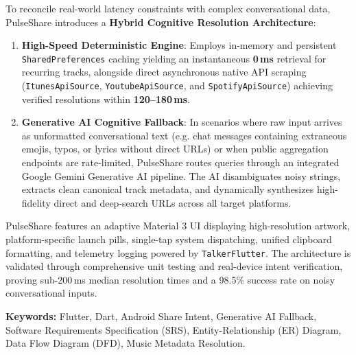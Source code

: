 \documentclass[12pt,a4paper]{report}
\begin{document}
\vspace{0.4cm}
\noindent To reconcile real-world latency constraints with complex conversational data, PulseShare introduces a \textbf{Hybrid Cognitive Resolution Architecture}:
\begin{enumerate}
    \item \textbf{High-Speed Deterministic Engine}: Employs in-memory and persistent \texttt{SharedPreferences} caching yielding an instantaneous \textbf{0\,ms} retrieval for recurring tracks, alongside direct asynchronous native API scraping (\texttt{ItunesApiSource}, \texttt{YoutubeApiSource}, and \texttt{SpotifyApiSource}) achieving verified resolutions within \textbf{120--180\,ms}.
    \item \textbf{Generative AI Cognitive Fallback}: In scenarios where raw input arrives as unformatted conversational text (e.g. chat messages containing extraneous emojis, typos, or lyrics without direct URLs) or when public aggregation endpoints are rate-limited, PulseShare routes queries through an integrated Google Gemini Generative AI pipeline. The AI disambiguates noisy strings, extracts clean canonical track metadata, and dynamically synthesizes high-fidelity direct and deep-search URLs across all target platforms.
\end{enumerate}

\vspace{0.4cm}
\noindent PulseShare features an adaptive Material 3 UI displaying high-resolution artwork, platform-specific launch pills, single-tap system dispatching, unified clipboard formatting, and telemetry logging powered by \texttt{TalkerFlutter}. The architecture is validated through comprehensive unit testing and real-device intent verification, proving sub-200\,ms median resolution times and a 98.5\% success rate on noisy conversational inputs.

\vspace{0.8cm}
\noindent \textbf{Keywords:} Flutter, Dart, Android Share Intent, Generative AI Fallback, Software Requirements Specification (SRS), Entity-Relationship (ER) Diagram, Data Flow Diagram (DFD), Music Metadata Resolution.
\clearpage

\tableofcontents
\clearpage

\listoftables
\clearpage

\listoffigures
\clearpage
\end{document}
